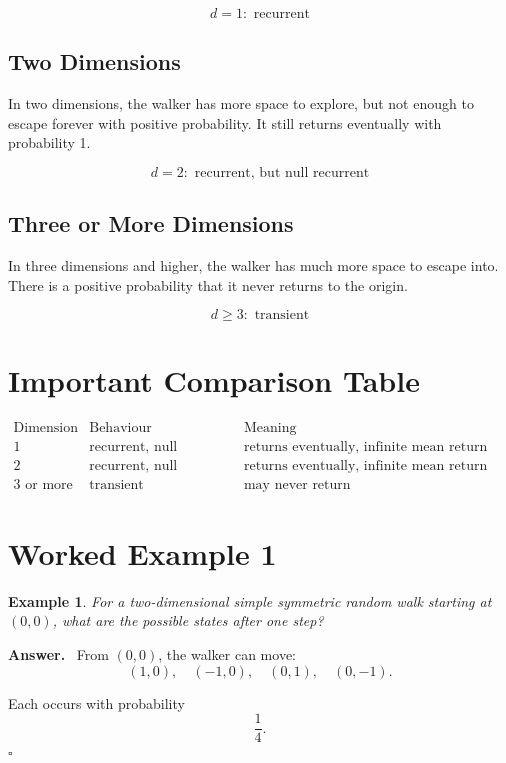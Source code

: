\documentclass[12pt,a4paper]{article}
\theoremstyle{notestyle}
\newtheorem{example}{Example}
\newenvironment{answer}
{\par\textbf{Answer.}\ }
{\hfill$\square$\par}
\begin{document}
\[
\boxed{d=1:\text{ recurrent}}
\]

\subsection*{Two Dimensions}

In two dimensions, the walker has more space to explore, but not enough to escape forever with positive probability. It still returns eventually with probability 1.

\[
\boxed{d=2:\text{ recurrent, but null recurrent}}
\]

\subsection*{Three or More Dimensions}

In three dimensions and higher, the walker has much more space to escape into. There is a positive probability that it never returns to the origin.

\[
\boxed{d\geq3:\text{ transient}}
\]

\section{Important Comparison Table}

\[
\begin{array}{c|c|c}
\text{Dimension} & \text{Behaviour} & \text{Meaning}\\
\hline
1 & \text{recurrent, null recurrent} & \text{returns eventually, infinite mean return time}\\
2 & \text{recurrent, null recurrent} & \text{returns eventually, infinite mean return time}\\
3\text{ or more} & \text{transient} & \text{may never return}
\end{array}
\]

\section{Worked Example 1}

\begin{example}
For a two-dimensional simple symmetric random walk starting at $(0,0)$, what are the possible states after one step?
\end{example}

\begin{answer}
From $(0,0)$, the walker can move:
\[
(1,0),\quad (-1,0),\quad (0,1),\quad (0,-1).
\]

Each occurs with probability
\[
\frac14.
\]
\end{answer}
\end{document}
